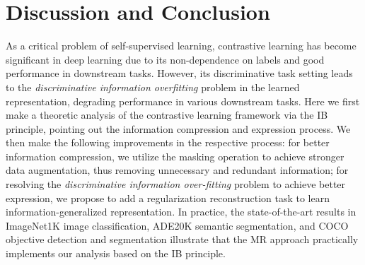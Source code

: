 \documentclass[10pt,twocolumn,letterpaper]{article}
\begin{document}
\section{Discussion and Conclusion}
As a critical problem of self-supervised learning, contrastive learning has become significant in deep learning due to its non-dependence on labels and good performance in downstream tasks. However, its discriminative task setting leads to the \textit{discriminative information overfitting} problem in the learned representation, degrading performance in various downstream tasks. Here we first make a theoretic analysis of the contrastive learning framework via the IB principle, pointing out the information compression and expression process. We then make the following improvements in the respective process: for better information compression, we utilize the masking operation to achieve stronger data augmentation, thus removing unnecessary and redundant information; for resolving the \textit{discriminative information over-fitting} problem to achieve better expression, we propose to add a regularization reconstruction task to learn information-generalized representation. In practice, the state-of-the-art results in ImageNet1K image classification, ADE20K semantic segmentation, and COCO objective detection and segmentation illustrate that the MR approach practically implements our analysis based on the IB principle.
\end{document}
